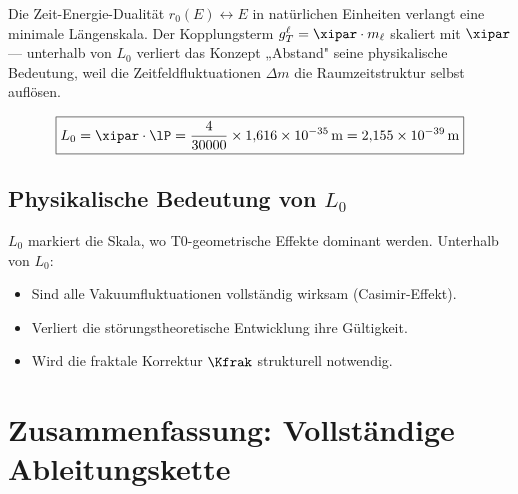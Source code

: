 Die Zeit-Energie-Dualität $r_0(E) \leftrightarrow E$ in natürlichen Einheiten verlangt eine minimale Längenskala. Der Kopplungsterm $g_T^\ell = \xipar \cdot m_\ell$ skaliert mit $\xipar$ — unterhalb von $L_0$ verliert das Konzept „Abstand" seine physikalische Bedeutung, weil die Zeitfeldfluktuationen $\Delta m$ die Raumzeitstruktur selbst auflösen.

\begin{keyresult}
\begin{equation}
	\boxed{L_0 = \xipar \cdot \lP = \frac{4}{30000} \times 1{,}616 \times 10^{-35}\,\text{m} = 2{,}155 \times 10^{-39}\,\text{m}}
	\label{eq:L0}
\end{equation}
\end{keyresult}

\subsection{Physikalische Bedeutung von \texorpdfstring{$L_0$}{L0}}

$L_0$ markiert die Skala, wo T0-geometrische Effekte dominant werden. Unterhalb von $L_0$:
\begin{itemize}
	\item Sind alle Vakuumfluktuationen vollständig wirksam (Casimir-Effekt).
	\item Verliert die störungstheoretische Entwicklung ihre Gültigkeit.
	\item Wird die fraktale Korrektur $\Kfrak$ strukturell notwendig.
\end{itemize}

\section{Zusammenfassung: Vollständige Ableitungskette}


